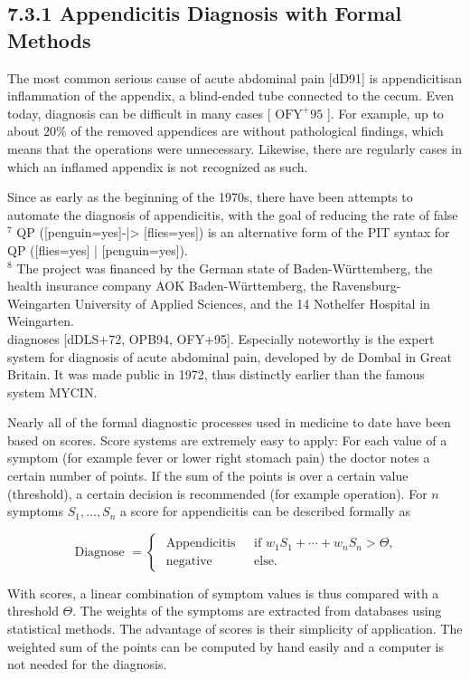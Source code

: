 \documentclass[10pt]{article}
\begin{document}
\subsection*{7.3.1 Appendicitis Diagnosis with Formal Methods}
The most common serious cause of acute abdominal pain [dD91] is appendicitisan inflammation of the appendix, a blind-ended tube connected to the cecum. Even today, diagnosis can be difficult in many cases [ $\mathrm{OFY}^{+} 95$ ]. For example, up to about $20 \%$ of the removed appendices are without pathological findings, which means that the operations were unnecessary. Likewise, there are regularly cases in which an inflamed appendix is not recognized as such.

Since as early as the beginning of the 1970s, there have been attempts to automate the diagnosis of appendicitis, with the goal of reducing the rate of false\\
${ }^{7}$ QP ([penguin=yes]-|> [flies=yes]) is an alternative form of the PIT syntax for QP ([flies=yes] | [penguin=yes]).\\
${ }^{8}$ The project was financed by the German state of Baden-Württemberg, the health insurance company AOK Baden-Württemberg, the Ravensburg-Weingarten University of Applied Sciences, and the 14 Nothelfer Hospital in Weingarten.\\[0pt]
diagnoses [dDLS+72, OPB94, OFY+95]. Especially noteworthy is the expert system for diagnosis of acute abdominal pain, developed by de Dombal in Great Britain. It was made public in 1972, thus distinctly earlier than the famous system MYCIN.


Nearly all of the formal diagnostic processes used in medicine to date have been based on scores. Score systems are extremely easy to apply: For each value of a symptom (for example fever or lower right stomach pain) the doctor notes a certain number of points. If the sum of the points is over a certain value (threshold), a certain decision is recommended (for example operation). For $n$ symptoms $S_{1}, \ldots, S_{n}$ a score for appendicitis can be described formally as

$$
\text { Diagnose }= \begin{cases}\text { Appendicitis } & \text { if } w_{1} S_{1}+\cdots+w_{n} S_{n}>\Theta, \\ \text { negative } & \text { else. }\end{cases}
$$

With scores, a linear combination of symptom values is thus compared with a threshold $\Theta$. The weights of the symptoms are extracted from databases using statistical methods. The advantage of scores is their simplicity of application. The weighted sum of the points can be computed by hand easily and a computer is not needed for the diagnosis.
\end{document}
